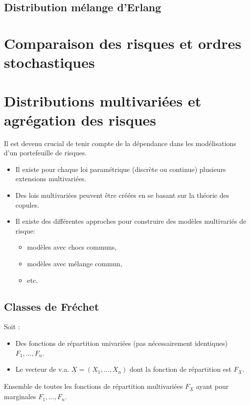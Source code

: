 \documentclass[10pt, french]{article}
\begin{document}
\begin{multicols*}{2}
\columnbreak
\subsection{Distribution mélange d'Erlang}



\pagebreak
\section{Comparaison des risques et ordres stochastiques}


\pagebreak
\section{Distributions multivariées et agrégation des risques}
\begin{rappel_enhanced}[Contexte]
Il est devenu crucial de tenir compte de la dépendance dans les modélisations d'un portefeuille de risques.
\begin{itemize}
	\item	Il existe pour chaque loi paramétrique (discrète ou continue) plusieurs extensions multivariées.
	\item	Des lois multivariées peuvent être créées en se basant sur la théorie des copules.
	\item	Il existe des différentes approches pour construire des modèles multivariés de risque: 
		\begin{itemize}
		\item	modèles avec chocs communs,
		\item	modèles avec mélange commun,
		\item	etc.
		\end{itemize}
\end{itemize}
\end{rappel_enhanced}


\subsection{Classes de Fréchet}
Soit : 
\begin{itemize}
	\item	Des fonctions de répartition univariées (pas nécessairement identiques) $F_{1}, \dots, F_{n}$.
	\item	Le vecteur de v.a. $\underline{X}	=	(X_{1}, \dots, X_{n})$ dont la fonction de répartition est $F_{\underline{X}}$.
\end{itemize}
\begin{definitionNOHFILL}
Ensemble de toutes les fonctions de répartition multivariées $F_{\underline{X}}$ ayant pour marginales $F_{1}, \dots, F_{n}$.
\end{definitionNOHFILL}


\end{multicols*}
\end{document}
